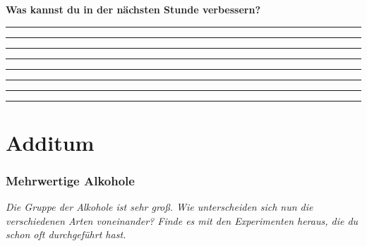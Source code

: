 \documentclass{scrartcl}  %
\begin{document}
\begin{center}
\begin{tcolorbox}
\begin{center}
\begin{tikzpicture}[scale=1]
							\end{tikzpicture}
						\end{center}
						\textbf{{\Large Was kannst du in der nächsten Stunde verbessern?}}
						\begin{center}
							\noindent\rule{12cm}{0.2pt}
							\vspace{1.1cm}
							\noindent\rule{12cm}{0.1pt}
							\vspace{1.1cm}
							\noindent\rule{12cm}{0.1pt}
							\vspace{1.1cm}
							\noindent\rule{12cm}{0.1pt}
							\vspace{1.1cm}
							\noindent\rule{12cm}{0.1pt}
							\vspace{1.1cm}
							\noindent\rule{12cm}{0.1pt}
							\vspace{1.1cm}
							\noindent\rule{12cm}{0.1pt}
							\vspace{1.1cm}
							\noindent\rule{12cm}{0.1pt}
						\end{center}
					\end{tcolorbox}
				\end{center}
								


\newpage
	\part{Additum}
		\section{Mehrwertige Alkohole}

			\textit{Die Gruppe der Alkohole ist sehr groß. Wie unterscheiden sich nun die verschiedenen Arten voneinander? Finde es mit den Experimenten heraus, die du schon oft durchgeführt hast.} \newline
			
\end{document}
